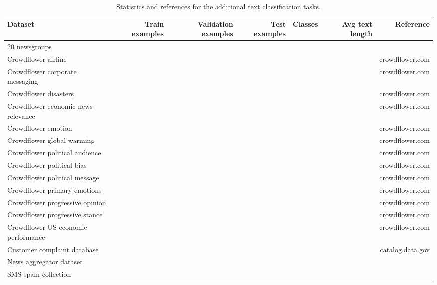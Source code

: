 \documentclass{article}
\begin{document}
\begin{table*}[ht]
\centering
\begin{adjustbox}{max width=\textwidth}
\begin{tabular}{l|rrrrrr}
\toprule
Dataset & Train examples & Validation examples & Test examples & Classes & Avg text length & Reference \\
\midrule
20 newsgroups &  &  &  &  &  & \citep{Lang95} \\
Crowdflower airline &  &  &  &  &  & crowdflower.com \\
Crowdflower corporate messaging &  &  &  &  &  & crowdflower.com \\
Crowdflower disasters &  &  &  &  &  & crowdflower.com \\
Crowdflower economic news relevance &  &  &  &  &  & crowdflower.com \\
Crowdflower emotion &  &  &  &  &  & crowdflower.com \\
Crowdflower global warming &  &  &  &  &  & crowdflower.com \\
Crowdflower political audience &  &  &  &  &  & crowdflower.com \\
Crowdflower political bias &  &  &  &  &  & crowdflower.com \\
Crowdflower political message &  &  &  &  &  & crowdflower.com \\
Crowdflower primary emotions &  &  &  &  &  & crowdflower.com \\
Crowdflower progressive opinion &  &  &  &  &  & crowdflower.com \\
Crowdflower progressive stance &  &  &  &  &  & crowdflower.com \\
Crowdflower US economic performance &  &  &  &  &  & crowdflower.com \\
Customer complaint database &  &  &  &  &  & catalog.data.gov \\
News aggregator dataset &  &  &  &  &  & \citep{Lichman:2013}\\
SMS spam collection &  &  &  &  &  & \citep{Almeida:2011:CSS:2034691.2034742}\\
\bottomrule
\end{tabular}
\end{adjustbox}
\caption{Statistics and references for the additional text classification tasks.}
\label{tab:hub_stats}
\end{table*}
\end{document}
